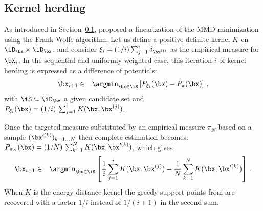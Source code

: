 \subsection{Kernel herding}\label{sec:KH}
As introduced in Section~\ref{sec:KH}, \citet{lacoste_2015} proposed a linearization of the MMD minimization using the Frank-Wolfe algorithm. 
Let us define a positive definite kernel $K$ on $\iD_\bx\times\iD_\bx$, and consider $\xi_i=(1/i)\sum_{j=1}^i \delta_{\bx^{(i)}}$ as the empirical measure for $\bX_i$.  
In the sequential and uniformly weighted case, this iteration $i$ of kernel herding is expressed as a difference of potentials: 
\begin{eqnarray}\label{eq:KH}
\bx_{i+1} &\in& \argmin_{\bx\in\iS} \left[P_{\xi_i}(\bx)-P_{\pi}(\bx)\right] \,,
\end{eqnarray}
with $\iS\subseteq\iD_\bx$ a given candidate set and $P_{\xi_i}(\bx) = (1/i)\, \sum_{j=1}^i K(\bx, \bx^{(j)})$. 

Once the targeted measure substituted by an empirical measure $\pi_N$ based on a sample $(\bx'^{(k)})_{k=1\ldots N}$ then complete estimation becomes: 
$P_{\pi_N}(\bx) = (1/N)\, \sum_{k=1}^N K(\bx, \bx'^{(k)})$, which gives
\begin{eqnarray*}
\bx_{i+1} &\in& \argmin_{\bx\in\iS} \left[ \frac{1}{i} \sum_{j=1}^{i} K(\bx,\bx^{(j)}) - \frac{1}{N} \sum_{k=1}^N K(\bx,\bx'^{(k)}) \right] \,.
\end{eqnarray*}
When $K$ is the energy-distance kernel  the greedy support points from  are recovered with a factor $1/i$ instead of $1/(i+1)$ in the second sum. 

